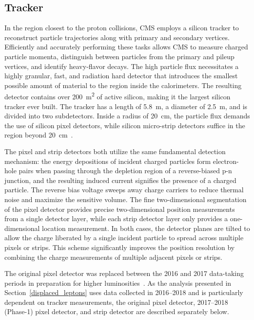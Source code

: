 \subsection{Tracker}
\label{tracker}
In the region closest to the proton collisions, CMS employs a silicon tracker to reconstruct particle trajectories along with primary and secondary vertices. Efficiently and accurately performing these tasks allows CMS to measure charged particle momenta, distinguish between particles from the primary and pileup vertices, and identify heavy-flavor decays. The high particle flux necessitates a highly granular, fast, and radiation hard detector that introduces the smallest possible amount of material to the region inside the calorimeters. The resulting detector contains over \SI{200}{\m\tothe{2}} of active silicon, making it the largest silicon tracker ever built. The tracker has a length of \SI{5.8}{\m}, a diameter of \SI{2.5}{\m}, and is divided into two subdetectors. Inside a radius of \SI{20}{\cm}, the particle flux demands the use of silicon pixel detectors, while silicon micro-strip detectors suffice in the region beyond \SI{20}{\cm}~\cite{cms_experiment}. 

The pixel and strip detectors both utilize the same fundamental detection mechanism: the energy depositions of incident charged particles form electron-hole pairs when passing through the depletion region of a reverse-biased p-n junction, and the resulting induced current signifies the presence of a charged particle. The reverse bias voltage sweeps away charge carriers to reduce thermal noise and maximize the sensitive volume. The fine two-dimensional segmentation of the pixel detector provides precise two-dimensional position measurements from a single detector layer, while each strip detector layer only provides a one-dimensional location measurement. In both cases, the detector planes are tilted to allow the charge liberated by a single incident particle to spread across multiple pixels or strips. This scheme significantly improves the position resolution by combining the charge measurements of multiple adjacent pixels or strips.

The original pixel detector was replaced between the 2016 and 2017 data-taking periods in preparation for higher luminosities~\cite{cms_phase1_pixels}. As the analysis presented in Section~\ref{displaced_leptons} uses data collected in 2016--2018 and is particularly dependent on tracker measurements, the original pixel detector, 2017--2018 (Phase-1) pixel detector, and strip detector are described separately below.

